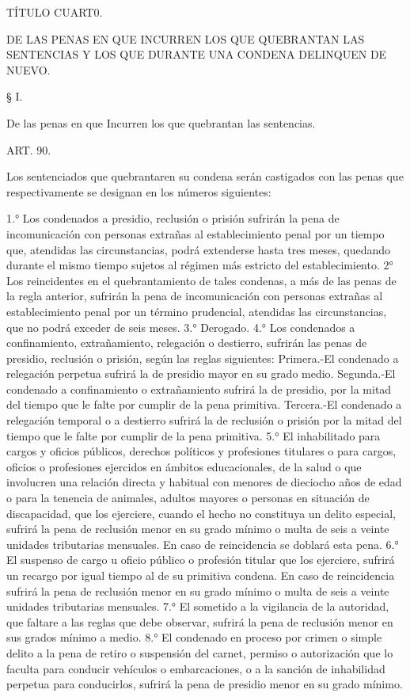     TÍTULO CUART0.

    DE LAS PENAS EN QUE INCURREN LOS QUE QUEBRANTAN LAS SENTENCIAS Y LOS QUE DURANTE UNA CONDENA DELINQUEN DE NUEVO.



    § I.

    De las penas en que Incurren los que quebrantan las sentencias.


    ART. 90.

    Los sentenciados que quebrantaren su condena serán castigados con las penas que respectivamente se designan en los números siguientes:

    1.° Los condenados a presidio, reclusión o prisión sufrirán la pena de incomunicación con personas extrañas al establecimiento penal por un tiempo que, atendidas las circunstancias, podrá extenderse hasta tres meses, quedando durante el mismo tiempo sujetos al régimen más estricto del establecimiento.
    2° Los reincidentes en el quebrantamiento de tales condenas, a más de las penas de la regla anterior, sufrirán la pena de incomunicación con personas extrañas al establecimiento penal por un término prudencial, atendidas las circunstancias, que no podrá exceder de seis meses.
    3.° Derogado.
    4.° Los condenados a confinamiento, extrañamiento, relegación o destierro, sufrirán las penas de presidio, reclusión o prisión, según las reglas siguientes:
    Primera.-El condenado a relegación perpetua sufrirá la de presidio mayor en su grado medio.
    Segunda.-El condenado a confinamiento o extrañamiento sufrirá la de presidio, por la mitad del tiempo que le falte por cumplir de la pena primitiva.
    Tercera.-El condenado a relegación temporal o a destierro sufrirá la de reclusión o prisión por la mitad del tiempo que le falte por cumplir de la pena primitiva.
    5.° El inhabilitado para cargos y oficios públicos, derechos políticos y profesiones titulares o para cargos, oficios o profesiones ejercidos en ámbitos educacionales, de la salud o que involucren una relación directa y habitual con menores de dieciocho años de edad o para la tenencia de animales, adultos mayores o personas en situación de discapacidad, que los ejerciere, cuando el hecho no constituya un delito especial, sufrirá la pena de reclusión menor en su grado mínimo o multa de seis a veinte unidades tributarias mensuales.
    En caso de reincidencia se doblará esta pena.
    6.° El suspenso de cargo u oficio público o profesión titular que los ejerciere, sufrirá un recargo por igual tiempo al de su primitiva condena.
    En caso de reincidencia sufrirá la pena de reclusión menor en su grado mínimo o multa de seis a veinte unidades tributarias mensuales.
    7.° El sometido a la vigilancia de la autoridad, que faltare a las reglas que debe observar, sufrirá la pena de reclusión menor en sus grados mínimo a medio.
    8.° El condenado en proceso por crimen o simple delito a la pena de retiro o suspensión del carnet, permiso o autorización que lo faculta para conducir vehículos o embarcaciones, o a la sanción de inhabilidad perpetua para conducirlos, sufrirá la pena de presidio menor en su grado mínimo.


